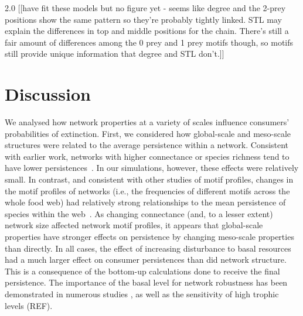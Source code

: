 \documentclass[12pt]{article}
\begin{document}
\begin{spacing}{2.0}
        [[have fit these models but no figure yet - seems like degree and the 2-prey positions show the same pattern so they're probably tightly linked. STL may explain the differences in top and middle positions for the chain. There's still a fair amount of differences among the 0 prey and 1 prey motifs though, so motifs still provide unique information that degree and STL don't.]]        


\section*{Discussion}


We analysed how network properties at a variety of scales influence consumers' probabilities of extinction.
First, we considered how global-scale and meso-scale structures were related to the average persistence within a network.
Consistent with earlier work, networks with higher connectance or species richness tend to have lower persistences~\citep{}.
In our simulations, however, these effects were relatively small.
In contrast, and consistent with other studies of motif profiles, changes in the motif profiles of networks (i.e., the frequencies of different motifs across the whole food web) had relatively strong relationships to the mean persistence of species within the web~\citep{prill2005dynamic, bascompte2005simple}.
As changing connectance (and, to a lesser extent) network size 
affected network motif profiles, it appears that global-scale properties have stronger effects on persistence by changing meso-scale properties than directly.
In all cases, the effect of increasing disturbance to basal resources had a much larger effect on consumer persistences than did network structure.
This is a consequence of the bottom-up calculations done to receive the final persistence. The importance of the basal level for network robustness has been demonstrated in numerous studies \citep{scherber2010bottom}, as well as the sensitivity of high trophic levels (REF).



\end{spacing}
\end{document}
